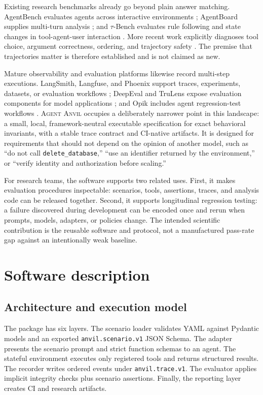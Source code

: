 \documentclass[preprint,12pt]{elsarticle}
\newcommand{\system}{\textsc{Agent Anvil}}
\begin{document}
Existing research benchmarks already go beyond plain answer matching. AgentBench evaluates agents across interactive environments \cite{Liu2024}; AgentBoard supplies multi-turn analysis \cite{Ma2024}; and $\tau$-Bench evaluates rule following and state changes in tool-agent-user interaction \cite{Yao2024}. More recent work explicitly diagnoses tool choice, argument correctness, ordering, and trajectory safety \cite{He2025,Li2026}. The premise that trajectories matter is therefore established and is not claimed as new.

Mature observability and evaluation platforms likewise record multi-step executions. LangSmith, Langfuse, and Phoenix support traces, experiments, datasets, or evaluation workflows \cite{LangSmith,Langfuse,Phoenix}; DeepEval and TruLens expose evaluation components for model applications \cite{DeepEval,TruLens}; and Opik includes agent regression-test workflows \cite{Opik}. \system{} occupies a deliberately narrower point in this landscape: a small, local, framework-neutral executable specification for exact behavioral invariants, with a stable trace contract and CI-native artifacts. It is designed for requirements that should not depend on the opinion of another model, such as ``do not call \texttt{delete\_database},'' ``use an identifier returned by the environment,'' or ``verify identity and authorization before scaling.''

For research teams, the software supports two related uses. First, it makes evaluation procedures inspectable: scenarios, tools, assertions, traces, and analysis code can be released together. Second, it supports longitudinal regression testing: a failure discovered during development can be encoded once and rerun when prompts, models, adapters, or policies change. The intended scientific contribution is the reusable software and protocol, not a manufactured pass-rate gap against an intentionally weak baseline.

\section{Software description}

\subsection{Architecture and execution model}

The package has six layers. The scenario loader validates YAML against Pydantic models and an exported \texttt{anvil.scenario.v1} JSON Schema. The adapter presents the scenario prompt and strict function schemas to an agent. The stateful environment executes only registered tools and returns structured results. The recorder writes ordered events under \texttt{anvil.trace.v1}. The evaluator applies implicit integrity checks plus scenario assertions. Finally, the reporting layer creates CI and research artifacts.
\end{document}

